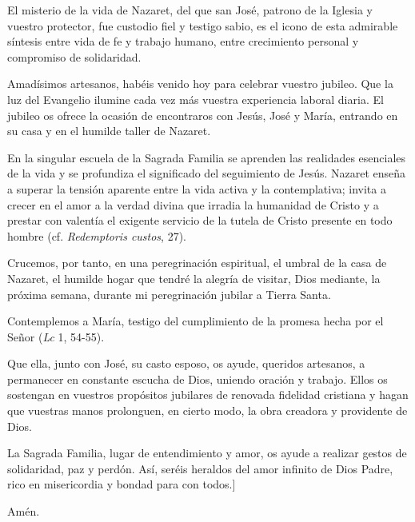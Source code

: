 \begin{body}
{El misterio de la vida de Nazaret, del que san José, patrono de la Iglesia y vuestro protector, fue custodio fiel y testigo sabio, es el icono de esta admirable síntesis entre vida de fe y trabajo humano, entre crecimiento personal y compromiso de solidaridad.

Amadísimos artesanos, habéis venido hoy para celebrar vuestro jubileo. Que la luz del Evangelio ilumine cada vez más vuestra experiencia laboral diaria. El jubileo os ofrece la ocasión de encontraros con Jesús, José y María, entrando en su casa y en el humilde taller de Nazaret.

En la singular escuela de la Sagrada Familia se aprenden las realidades esenciales de la vida y se profundiza el significado del seguimiento de Jesús. Nazaret enseña a superar la tensión aparente entre la vida activa y la contemplativa; invita a crecer en el amor a la verdad divina que irradia la humanidad de Cristo y a prestar con valentía el exigente servicio de la tutela de Cristo presente en todo hombre (cf. \textit{Redemptoris custos}, 27).

Crucemos, por tanto, en una peregrinación espiritual, el umbral de la casa de Nazaret, el humilde hogar que tendré la alegría de visitar, Dios mediante, la próxima semana, durante mi peregrinación jubilar a Tierra Santa.

Contemplemos a María, testigo del cumplimiento de la promesa hecha por el Señor  (\textit{Lc} 1, 54-55).

Que ella, junto con José, su casto esposo, os ayude, queridos artesanos, a permanecer en constante escucha de Dios, uniendo oración y trabajo. Ellos os sostengan en vuestros propósitos jubilares de renovada fidelidad cristiana y hagan que vuestras manos prolonguen, en cierto modo, la obra creadora y providente de Dios.

La Sagrada Familia, lugar de entendimiento y amor, os ayude a realizar gestos de solidaridad, paz y perdón. Así, seréis heraldos del amor infinito de Dios Padre, rico en misericordia y bondad para con todos.]}

Amén.
\end{body}


